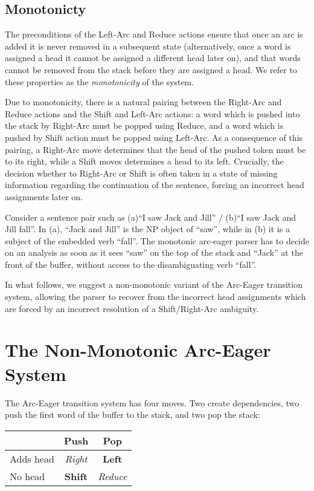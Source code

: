\documentclass[11pt,letterpaper]{article}
\begin{document}
\subsection{Monotonicty}

The preconditions of the Left-Arc and Reduce actions ensure that once an
arc is added it is never removed in a subsequent state (alternatively,
once a word is assigned a head it cannot be assigned a different head
later on), and that words cannot be removed from the stack before they
are assigned a head. We refer to these properties as the
\textit{monotonicity} of the system.

Due to monotonicity, there is a natural pairing between the Right-Arc and
Reduce actions and the Shift and Left-Arc actions: a word which is pushed
into the stack by Right-Arc must be popped using Reduce,
 and a word which is pushed by Shift action must be popped
using Left-Arc.
As a consequence of this pairing, a Right-Arc move determines that the head of
the pushed token must be to its right, while a Shift moves determines a head
to its left. Crucially, the decision whether to Right-Arc or Shift is often taken
in a state of missing information regarding the continuation of the sentence,
forcing an incorrect head assignments later on. 

Consider a sentence pair such as (a)``I saw Jack and Jill'' / (b)``I saw Jack and Jill
fall''. In (a), ``Jack and Jill'' is the NP object of ``saw'', while
in (b) it is a subject of the embedded verb ``fall''.  The monotonic arc-eager
parser has to decide on an analysis as soon as it sees ``saw'' on the top of the
stack and ``Jack'' at the front of the buffer, without access to the
disambiguating verb ``fall''.  

In what follows, we suggest a non-monotonic variant of the Arc-Eager transition
system, allowing the parser to recover from the incorrect head assignments
which are forced by an incorrect resolution of a Shift/Right-Arc ambiguity.

\section{The Non-Monotonic Arc-Eager System}

The Arc-Eager transition system \citep{nivre:04} has four moves. Two create 
dependencies, two push the first word of the buffer to the stack, and two pop 
the stack:

\begin{center}
    \begin{tabular}{l|cc}
             & Push  & Pop    \\
           \hline
           Adds head   & \emph{Right} & \textbf{Left}    \\
            No head    & \textbf{Shift} & \emph{Reduce}   \\
     \end{tabular}
\end{center}
\end{document}
